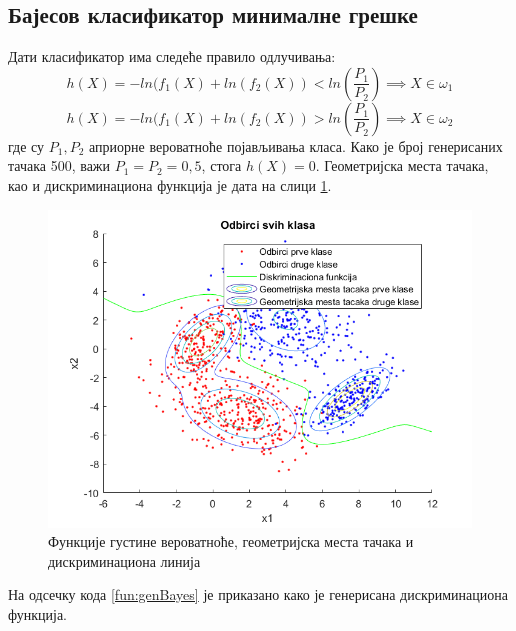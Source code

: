 \subsection{Бајесов класификатор минималне грешке}
Дати класификатор има следеће правило одлучивања:
$$h(X) = -ln(f_1(X) + ln(f_2(X)) < ln\left( \frac{P_1}{P_2}\right) \implies X \in \omega_1$$
$$h(X) = -ln(f_1(X) + ln(f_2(X)) >ln\left( \frac{P_1}{P_2}\right) \implies X \in \omega_2$$
где су $P_1, P_2$ априорне вероватноће појављивања класа. Како је број генерисаних тачака 500, важи $P_1 = P_2 = 0,5$, стога $h(X)= 0$. Геометријска места тачака, као и дискриминациона функција је дата на слици \ref{fig:Bayes}.

\begin{figure}[htb!]
\centering
\includegraphics[scale=0.53]{pictures/2/Bayes}
\caption{Функције густине вероватноће, геометријска места тачака и дискриминациона линија}\label{fig:Bayes}
\end{figure}
На одсечку кода \ref{fun:genBayes} је приказано како је генерисана дискриминациона функција.
